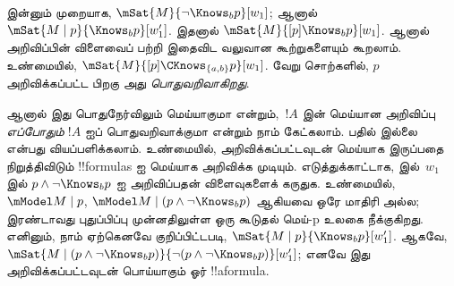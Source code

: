 \documentclass[../../../include/open-logic-section]{subfiles}
\begin{document}
இன்னும் முறையாக, $\mSat{M}{\lnot \Knows_b p}[w_1]$; ஆனால் $\mSat{M
\mid p}{\Knows_b p}[w'_1]$. இதனால் $\mSat{M}{[p] \Knows_b
p}[w_1]$. ஆனால் அறிவிப்பின் விளைவைப் பற்றி இதைவிட வலுவான கூற்றுகளையும்
கூறலாம். உண்மையில், $\mSat{M}{[p]\CKnows_{\{a,b\}} p}[w_1]$. வேறு
சொற்களில், $p$ அறிவிக்கப்பட்ட பிறகு அது \emph{பொதுவறிவாகிறது}.

ஆனால் இது பொதுநேர்விலும் மெய்யாகுமா என்றும்,~$!A$ இன் மெய்யான அறிவிப்பு
\emph{எப்போதும்} $!A$ ஐப் பொதுவறிவாக்குமா என்றும் நாம் கேட்கலாம். பதில்
இல்லை என்பது வியப்பளிக்கலாம். உண்மையில், அறிவிக்கப்பட்டவுடன் மெய்யாக
இருப்பதை நிறுத்திவிடும் !!{formula}s ஐ மெய்யாக அறிவிக்க முடியும்.
எடுத்துக்காட்டாக,  இல்~$w_1$ இல்
$p \land \lnot \Knows_b p$ ஐ அறிவிப்பதன் விளைவுகளைக் கருதுக. உண்மையில்,
$\mModel M \mid p$, $\mModel M \mid (p \land \lnot \Knows_b p)$ ஆகியவை
ஒரே மாதிரி அல்ல; இரண்டாவது புதுப்பிப்பு முன்னதிலுள்ள ஒரு கூடுதல்
மெய்-p உலகை நீக்குகிறது. எனினும், நாம் ஏற்கெனவே குறிப்பிட்டபடி,
$\mSat{M \mid p}{\Knows_b p}[w'_1]$. ஆகவே,
$\mSat{M \mid (p \land \lnot \Knows_b p)}{\lnot
(p \land \lnot \Knows_b p)}[w'_1]$; எனவே இது அறிவிக்கப்பட்டவுடன்
பொய்யாகும் ஓர் !!a{formula}.
\end{document}
